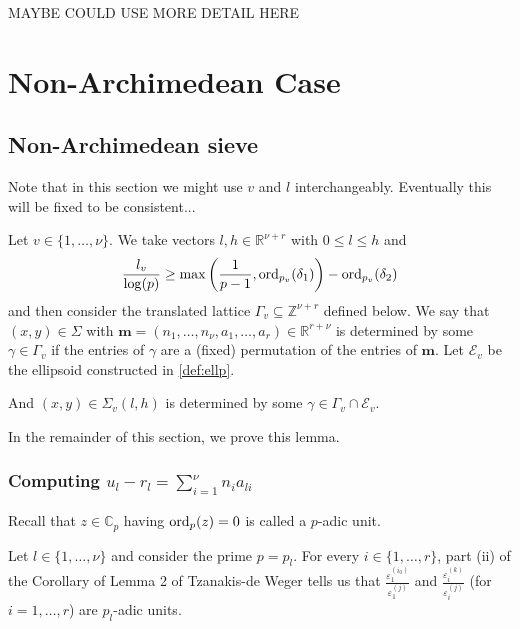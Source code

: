 MAYBE COULD USE MORE DETAIL HERE

\section{Non-Archimedean Case}

\subsection{Non-Archimedean sieve}

Note that in this section we might use $v$ and $l$ interchangeably. Eventually this will be fixed to be consistent...

Let $v \in \{1, \dots, \nu\}$. We take vectors $l,h \in \mathbb{R}^{\nu+r}$ with $0 \leq l \leq h$ and 
\[\frac{l_v}{\log(p)} \geq \max\left( \frac{1}{p-1}, \operatorname{ord}_{p_v}(\delta_1)\right) - \operatorname{ord}_{p_v}(\delta_2)\]
and then consider the translated lattice $\Gamma_v \subseteq \mathbb{Z}^{\nu + r}$ defined below. We say that $(x,y) \in \Sigma$ with ${\mathbf{m} = (n_1, \dots, n_{\nu}, a_1, \dots, a_r) \in \mathbb{R}^{r + \nu}}$ is determined by some $\gamma \in \Gamma_v$ if the entries of $\gamma$ are a (fixed) permutation of the entries of $\mathbf{m}$. Let $\mathcal{E}_v$ be the ellipsoid constructed in \eqref{def:ellp}. 

\begin{lemma}
And $(x,y) \in \Sigma_v(l,h)$ is determined by some $\gamma \in \Gamma_v \cap \mathcal{E}_v$. 
\end{lemma}

In the remainder of this section, we prove this lemma. 

\subsubsection{Computing $u_l - r_l = \sum_{i = 1}^{\nu} n_ia_{li}$}

Recall that $z \in \mathbb{C}_p$ having $\operatorname{ord}_p(z) = 0$ is called a $p$-adic unit. 

Let $l \in \{1, \dots, \nu \}$ and consider the prime $p = p_l$. For every $i \in \{1, \dots, r\}$, part (ii) of the Corollary of Lemma 2 of Tzanakis-de Weger tells us that $\frac{\varepsilon_1^{(i_0)}}{\varepsilon_1^{(j)}}$ and $\frac{\varepsilon_i^{(k)}}{\varepsilon_i^{(j)}}$ (for $i = 1, \dots, r$) are $p_l$-adic units. 

